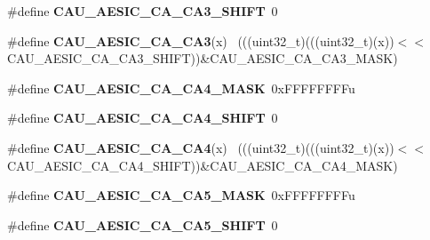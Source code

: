 \begin{DoxyCompactItemize}
\item 
\hypertarget{group___c_a_u___register___masks_gaa4221586809a5c86c3209735723f6427}{}\#define {\bfseries C\+A\+U\+\_\+\+A\+E\+S\+I\+C\+\_\+\+C\+A\+\_\+\+C\+A3\+\_\+\+S\+H\+I\+F\+T}~0\label{group___c_a_u___register___masks_gaa4221586809a5c86c3209735723f6427}

\item 
\hypertarget{group___c_a_u___register___masks_ga8122974f403755387a36cef8653aaf8d}{}\#define {\bfseries C\+A\+U\+\_\+\+A\+E\+S\+I\+C\+\_\+\+C\+A\+\_\+\+C\+A3}(x)                                        ~(((uint32\+\_\+t)(((uint32\+\_\+t)(x))$<$$<$C\+A\+U\+\_\+\+A\+E\+S\+I\+C\+\_\+\+C\+A\+\_\+\+C\+A3\+\_\+\+S\+H\+I\+F\+T))\&C\+A\+U\+\_\+\+A\+E\+S\+I\+C\+\_\+\+C\+A\+\_\+\+C\+A3\+\_\+\+M\+A\+S\+K)\label{group___c_a_u___register___masks_ga8122974f403755387a36cef8653aaf8d}

\item 
\hypertarget{group___c_a_u___register___masks_ga5f7f6b876abee0856218de45b4d3323e}{}\#define {\bfseries C\+A\+U\+\_\+\+A\+E\+S\+I\+C\+\_\+\+C\+A\+\_\+\+C\+A4\+\_\+\+M\+A\+S\+K}~0x\+F\+F\+F\+F\+F\+F\+F\+Fu\label{group___c_a_u___register___masks_ga5f7f6b876abee0856218de45b4d3323e}

\item 
\hypertarget{group___c_a_u___register___masks_gabd609af8c8366c17977c9afb71ad3ca5}{}\#define {\bfseries C\+A\+U\+\_\+\+A\+E\+S\+I\+C\+\_\+\+C\+A\+\_\+\+C\+A4\+\_\+\+S\+H\+I\+F\+T}~0\label{group___c_a_u___register___masks_gabd609af8c8366c17977c9afb71ad3ca5}

\item 
\hypertarget{group___c_a_u___register___masks_ga77571bd71515a26fda77750cdba40394}{}\#define {\bfseries C\+A\+U\+\_\+\+A\+E\+S\+I\+C\+\_\+\+C\+A\+\_\+\+C\+A4}(x)                                        ~(((uint32\+\_\+t)(((uint32\+\_\+t)(x))$<$$<$C\+A\+U\+\_\+\+A\+E\+S\+I\+C\+\_\+\+C\+A\+\_\+\+C\+A4\+\_\+\+S\+H\+I\+F\+T))\&C\+A\+U\+\_\+\+A\+E\+S\+I\+C\+\_\+\+C\+A\+\_\+\+C\+A4\+\_\+\+M\+A\+S\+K)\label{group___c_a_u___register___masks_ga77571bd71515a26fda77750cdba40394}

\item 
\hypertarget{group___c_a_u___register___masks_ga28294b997bba57c20628810c8a6a2b62}{}\#define {\bfseries C\+A\+U\+\_\+\+A\+E\+S\+I\+C\+\_\+\+C\+A\+\_\+\+C\+A5\+\_\+\+M\+A\+S\+K}~0x\+F\+F\+F\+F\+F\+F\+F\+Fu\label{group___c_a_u___register___masks_ga28294b997bba57c20628810c8a6a2b62}

\item 
\hypertarget{group___c_a_u___register___masks_gaf4c9726f6f0de1a13fa2b5a24034827b}{}\#define {\bfseries C\+A\+U\+\_\+\+A\+E\+S\+I\+C\+\_\+\+C\+A\+\_\+\+C\+A5\+\_\+\+S\+H\+I\+F\+T}~0\label{group___c_a_u___register___masks_gaf4c9726f6f0de1a13fa2b5a24034827b}


\end{DoxyCompactItemize}
